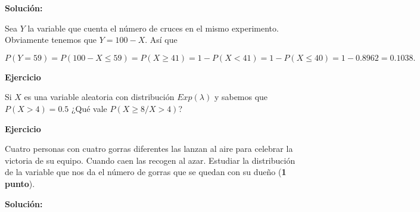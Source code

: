 \documentclass[12pt,spanish,es-nodecimaldot]{article}\usepackage[]{graphicx}\usepackage[]{color}
\newcounter{problemes}
\newcounter{punts} \def\thepunts{\arabic{punts}}
\def\probl{\textbf{\newline\noindent\hspace{-1cm} Ejercicio}\addtocounter{problemes}{1} \setcounter{punts}{0}
\medskip\noindent{\bf \theproblemes) }}
\newif\ifsol
\begin{document}
\textbf{Solución:}

Sea $Y$ la variable que cuenta el número de cruces en el mismo experimento. Obviamente tenemos que $Y=100-X$. 
Así que 

$$P(Y=59)= P(100-X\leq 59) = P(X\geq 41)= 1-P(X < 41)=1-P(X\leq 40)=1-0.8962=0.1038.$$

\else
\fi

\probl Si $X$ es una variable aleatoria con distribución $Exp(\lambda)$ y sabemos que $P(X>4)=0.5$ ¿Qué vale $P(X\geq 8/X>4)$?


\ifsol

\textbf{Solución:}

Sabemos que la distribución exponencial carece de memoria lo que quiere decir que 
$P(X> x+y/X>x)=P(X> y)$. En nuestro caso 

$$P(X>8/X>4)=P(X> 4+4/X>4)=P(X>4)=0.5.$$

\fi

% 
% 


\probl Cuatro personas con cuatro gorras diferentes las lanzan al aire para celebrar la victoria de su equipo. Cuando caen las recogen al azar. Estudiar la distribución de la variable que nos da  el número de gorras que se quedan con su dueño (\textbf{1 punto}).

\ifsol

\textbf{Solución:}
\end{document}
